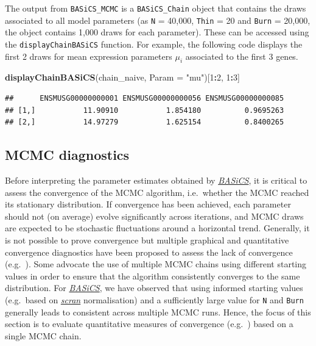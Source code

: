 \documentclass[9pt,a4paper,]{extarticle}
\newenvironment{Shaded}{\begin{snugshade}}{\end{snugshade}}
\newcommand{\DataTypeTok}[1]{\textcolor[rgb]{0.13,0.29,0.53}{#1}}
\newcommand{\DecValTok}[1]{\textcolor[rgb]{0.00,0.00,0.81}{#1}}
\newcommand{\KeywordTok}[1]{\textcolor[rgb]{0.13,0.29,0.53}{\textbf{#1}}}
\newcommand{\NormalTok}[1]{#1}
\newcommand{\OperatorTok}[1]{\textcolor[rgb]{0.81,0.36,0.00}{\textbf{#1}}}
\newcommand{\StringTok}[1]{\textcolor[rgb]{0.31,0.60,0.02}{#1}}
\begin{document}
The output from \texttt{BASiCS\_MCMC} is a \texttt{BASiCS\_Chain} object that contains the
draws associated to all model parameters (as \texttt{N} = 40,000, \texttt{Thin} = 20 and
\texttt{Burn} = 20,000, the object contains 1,000 draws for each parameter).
These can be accessed using the \texttt{displayChainBASiCS} function.
For example, the following code displays the first 2 draws for mean
expression parameters \(\mu_i\) associated to the first 3 genes.

\begin{Shaded}
\begin{Highlighting}[]
\KeywordTok{displayChainBASiCS}\NormalTok{(chain_naive, }\DataTypeTok{Param =} \StringTok{"mu"}\NormalTok{)[}\DecValTok{1}\OperatorTok{:}\DecValTok{2}\NormalTok{, }\DecValTok{1}\OperatorTok{:}\DecValTok{3}\NormalTok{]}
\end{Highlighting}
\end{Shaded}

\begin{verbatim}
##      ENSMUSG00000000001 ENSMUSG00000000056 ENSMUSG00000000085
## [1,]           11.90910           1.854180          0.9695263
## [2,]           14.97279           1.625154          0.8400265
\end{verbatim}

\hypertarget{mcmc-diagnostics}{%
\subsection{MCMC diagnostics}\label{mcmc-diagnostics}}

Before interpreting the parameter estimates obtained by \emph{\href{https://bioconductor.org/packages/3.11/BASiCS}{BASiCS}},
it is critical to assess the convergence of the MCMC algorithm, i.e.~whether
the MCMC reached its stationary distribution.
If convergence has been achieved, each parameter should not (on average) evolve
significantly across iterations, and MCMC draws are expected to be stochastic
fluctuations around a horizontal trend.
Generally, it is not possible to prove convergence but multiple graphical and
quantitative convergence diagnostics have been proposed to assess the lack
of convergence (e.g.~\citep{CowlesCarlin1996, BrooksGelman1998}).
Some advocate the use of multiple MCMC chains using different starting values in
order to ensure that the algorithm consistently converges to the same
distribution.
For \emph{\href{https://bioconductor.org/packages/3.11/BASiCS}{BASiCS}}, we have observed that using informed starting values
(e.g.~based on \emph{\href{https://bioconductor.org/packages/3.11/scran}{scran}} normalisation) and a sufficiently large
value for \texttt{N} and \texttt{Burn} generally leads to consistent across multiple MCMC runs.
Hence, the focus of this section is to evaluate quantitative measures of
convergence (e.g.~\citep{Geweke1995}) based on a single MCMC chain.
\end{document}
